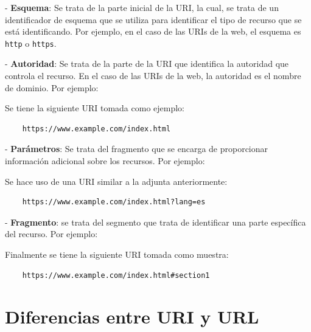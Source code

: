 \documentclass[11pt]{report}
\begin{document}
- \textbf{Esquema}: Se trata de la parte inicial de la URI, la cual, se trata de un identificador de esquema que se utiliza para identificar el tipo de recurso que se está identificando. Por ejemplo, en el caso de las URIs de la web, el esquema es \texttt{http} o \texttt{https}.

- \textbf{Autoridad}: Se trata de la parte de la URI que identifica la autoridad que controla el recurso. En el caso de las URIs de la web, la autoridad es el nombre de dominio. Por ejemplo:

Se tiene la siguiente URI tomada como ejemplo:

\begin{verbatim}
	https://www.example.com/index.html
\end{verbatim}


- \textbf{Parámetros}: Se trata del fragmento que se encarga de proporcionar información adicional sobre los recursos. Por ejemplo:

Se hace uso de una URI similar a la adjunta anteriormente:

\begin{verbatim}
	https://www.example.com/index.html?lang=es
\end{verbatim}


- \textbf{Fragmento}: se trata del segmento que trata de identificar una parte específica del recurso. Por ejemplo:

Finalmente se tiene la siguiente URI tomada como muestra:

\begin{verbatim}
	https://www.example.com/index.html#section1
\end{verbatim}


\section{Diferencias entre URI y URL}
\end{document}
